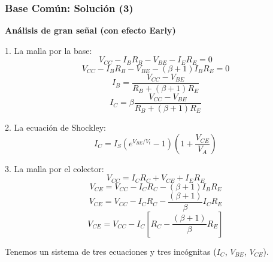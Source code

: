 \begin{frame}[t]
    \frametitle{Base Común: Solución (3)}

    \textbf{Análisis de gran señal (con efecto Early)}

    \begin{multicols}{2}
        1. La malla por la base:
        \[ V_{CC}-I_B R_B-V_{BE}-I_E R_E = 0 \]
        \[ V_{CC}-I_B R_B-V_{BE}-(\beta+1)I_B R_E = 0 \]
        \[ I_B = \dfrac{V_{CC}-V_{BE}}{R_B + (\beta+1)R_E} \]
        \[ I_C = \beta \dfrac{V_{CC}-V_{BE}}{R_B + (\beta+1)R_E} \]
        
        \vspace{3mm}
        2. La ecuación de Shockley:
        \[ I_C = I_S \left( e^{V_{BE}/V_t} - 1 \right)\left( 1 + \dfrac{V_{CE}}{V_A}\right) \]
        
        3. La malla por el colector:
        \[ V_{CC} = I_C R_C + V_{CE} + I_E R_E \]
        \[ V_{CE} = V_{CC} - I_C R_C - (\beta+1) I_B R_E \]
        \[ V_{CE} = V_{CC} - I_C R_C - \dfrac{(\beta+1)}{\beta} I_C R_E \]
        \[ V_{CE} = V_{CC} - I_C \left[ R_C - \dfrac{(\beta+1)}{\beta} R_E \right] \]

        \vspace{3mm}
        Tenemos un sistema de tres ecuaciones y tres incógnitas ($I_C$, $V_{BE}$, $V_{CE}$).
    \end{multicols}
\end{frame}
